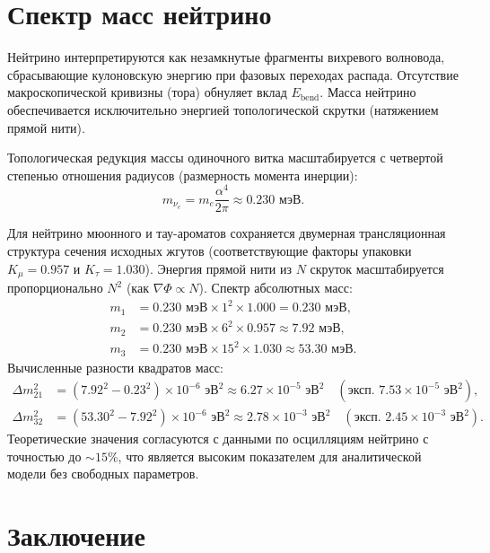 \documentclass[12pt,a4paper]{article}
\begin{document}
\section{Спектр масс нейтрино}

Нейтрино интерпретируются как незамкнутые фрагменты вихревого волновода, сбрасывающие кулоновскую энергию при фазовых переходах распада. Отсутствие макроскопической кривизны (тора) обнуляет вклад $E_{\text{bend}}$. Масса нейтрино обеспечивается исключительно энергией топологической скрутки (натяжением прямой нити).

Топологическая редукция массы одиночного витка масштабируется с четвертой степенью отношения радиусов (размерность момента инерции):
\begin{equation}
m_{\nu_e} = m_e \frac{\alpha^4}{2\pi} \approx 0.230 \text{ мэВ}.
\label{eq:neutrino_e}
\end{equation}

Для нейтрино мюонного и тау-ароматов сохраняется двумерная трансляционная структура сечения исходных жгутов (соответствующие факторы упаковки $K_\mu = 0.957$ и $K_\tau = 1.030$). Энергия прямой нити из $N$ скруток масштабируется пропорционально $N^2$ (как $\nabla\Phi \propto N$). Спектр абсолютных масс:
\begin{align}
m_1 &= 0.230 \text{ мэВ} \times 1^2 \times 1.000 = 0.230 \text{ мэВ}, \\
m_2 &= 0.230 \text{ мэВ} \times 6^2 \times 0.957 \approx 7.92 \text{ мэВ}, \\
m_3 &= 0.230 \text{ мэВ} \times 15^2 \times 1.030 \approx 53.30 \text{ мэВ}.
\end{align}
Вычисленные разности квадратов масс:
\begin{align}
\Delta m^2_{21} &= (7.92^2 - 0.23^2) \times 10^{-6} \text{ эВ}^2 \approx 6.27 \times 10^{-5} \text{ эВ}^2 \quad (\text{эксп. } 7.53 \times 10^{-5} \text{ эВ}^2), \\
\Delta m^2_{32} &= (53.30^2 - 7.92^2) \times 10^{-6} \text{ эВ}^2 \approx 2.78 \times 10^{-3} \text{ эВ}^2 \quad (\text{эксп. } 2.45 \times 10^{-3} \text{ эВ}^2).
\end{align}
Теоретические значения согласуются с данными по осцилляциям нейтрино \cite{pdg2024} с точностью до $\sim 15\%$, что является высоким показателем для аналитической модели без свободных параметров.

\section{Заключение}
\end{document}
